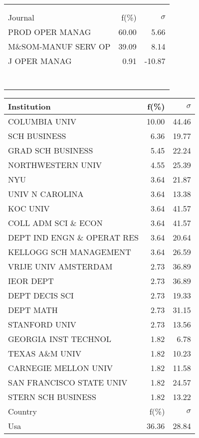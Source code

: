 \documentclass[a4paper,11pt]{report}
\begin{document}
\begin{landscape}
\begin{table}[!ht]
{\begin{tabular}{|l r  r|}
 &  & \\
 &  & \\
\hline
\hline
Journal & f(\%) & $\sigma$\\
\hline
PROD OPER MANAG & 60.00 & 5.66\\
M\&SOM-MANUF SERV OP & 39.09 & 8.14\\
J OPER MANAG & 0.91 & -10.87\\
 &  & \\
 &  & \\
 &  & \\
 &  & \\
 &  & \\
 &  & \\
 &  & \\
\hline
\end{tabular}
}
{\scriptsize\begin{tabular}{|l r r|}
\hline
Institution & f(\%) & $\sigma$\\
\hline
COLUMBIA UNIV & 10.00 & 44.46\\
SCH BUSINESS & 6.36 & 19.77\\
GRAD SCH BUSINESS & 5.45 & 22.24\\
NORTHWESTERN UNIV & 4.55 & 25.39\\
NYU & 3.64 & 21.87\\
UNIV N CAROLINA & 3.64 & 13.38\\
KOC UNIV & 3.64 & 41.57\\
COLL ADM SCI \& ECON & 3.64 & 41.57\\
DEPT IND ENGN \& OPERAT RES & 3.64 & 20.64\\
KELLOGG SCH MANAGEMENT & 3.64 & 26.59\\
VRIJE UNIV AMSTERDAM & 2.73 & 36.89\\
IEOR DEPT & 2.73 & 36.89\\
DEPT DECIS SCI & 2.73 & 19.33\\
DEPT MATH & 2.73 & 31.15\\
STANFORD UNIV & 2.73 & 13.56\\
GEORGIA INST TECHNOL & 1.82 & 6.78\\
TEXAS A\&M UNIV & 1.82 & 10.23\\
CARNEGIE MELLON UNIV & 1.82 & 11.58\\
SAN FRANCISCO STATE UNIV & 1.82 & 24.57\\
STERN SCH BUSINESS & 1.82 & 13.22\\
\hline
\hline
Country & f(\%) & $\sigma$\\
\hline
Usa & 36.36 & 28.84\\

\end{tabular}}
\end{table}
\end{landscape}
\end{document}
